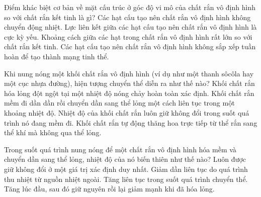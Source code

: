\begin{ex}
Điểm khác biệt cơ bản về mặt cấu trúc ở góc độ vi mô của chất rắn vô định hình so với chất rắn kết tinh là gì?
\choice
{Các hạt cấu tạo nên chất rắn vô định hình không chuyển động nhiệt.}
{Lực liên kết giữa các hạt cấu tạo nên chất rắn vô định hình là cực kỳ yếu.}
{Khoảng cách giữa các hạt trong chất rắn vô định hình rất lớn so với chất rắn kết tinh.}
{\True Các hạt cấu tạo nên chất rắn vô định hình không sắp xếp tuần hoàn để tạo thành mạng tinh thể.}
\end{ex}

\begin{ex}
Khi nung nóng một khối chất rắn vô định hình (ví dụ như một thanh sôcôla hay một cục nhựa đường), hiện tượng chuyển thể diễn ra như thế nào?
\choice
{Khối chất rắn hóa lỏng đột ngột tại một nhiệt độ nóng chảy hoàn toàn xác định.}
{\True Khối chất rắn mềm đi dần dần rồi chuyển dần sang thể lỏng một cách liên tục trong một khoảng nhiệt độ.}
{Nhiệt độ của khối chất rắn luôn giữ không đổi trong suốt quá trình nó đang mềm đi.}
{Khối chất rắn tự động thăng hoa trực tiếp từ thể rắn sang thể khí mà không qua thể lỏng.}
\end{ex}

\begin{ex}
Trong suốt quá trình nung nóng để một chất rắn vô định hình hóa mềm và chuyển dần sang thể lỏng, nhiệt độ của nó biến thiên như thế nào?
\choice
{Luôn được giữ không đổi ở một giá trị xác định duy nhất.}
{Giảm dần liên tục do quá trình thu nhiệt từ nguồn nhiệt ngoài.}
{\True Tăng liên tục trong suốt quá trình chuyển thể.}
{Tăng lúc đầu, sau đó giữ nguyên rồi lại giảm mạnh khi đã hóa lỏng.}
\end{ex}



